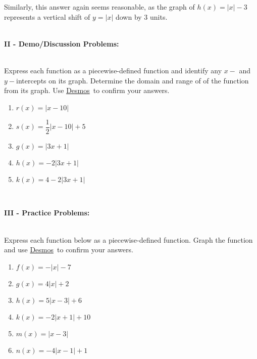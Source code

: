 \documentclass[12pt]{article}
\theoremstyle{definition}
\newcommand{\Desmos}{\href{https://www.desmos.com/}{Desmos}}
\begin{document}
Similarly, this answer again seems reasonable, as the graph of $h(x)=|x|-3$ represents a vertical shift of $y=|x|$ down by 3 units.\\
\ \par
{\bf II - Demo/Discussion Problems:}\\
\ \par
Express each function as a piecewise-defined function and identify any $x-$ and $y-$intercepts on its graph.  Determine the domain and range of of the function from its graph.  Use \Desmos \ to confirm your answers.
\begin{enumerate}
\item $r(x)=|x-10|$
\item $s(x)=\dfrac{1}{2}|x-10|+5$
\item $g(x)= |3x+1|$
\item $h(x)= -2|3x+1|$
\item $k(x)= 4-2|3x+1|$
\end{enumerate}
\ \par
{\bf III - Practice Problems:}\\
\ \par
Express each function below as a piecewise-defined function.  Graph the function and use \Desmos \ to confirm your answers.
\begin{multicols}{3}
\begin{enumerate}
	\item $f(x) = -|x|-7$
	\item $g(x) = 4|x|+2$
	\item $h(x) = 5|x-3|+6$
	\item $k(x) = -2|x+1|+10$
	\item $m(x) = |x-3|$
	\item $n(x) = -4|x-1|+1$
\end{enumerate}	
\end{multicols}
\newpage
\end{document}
